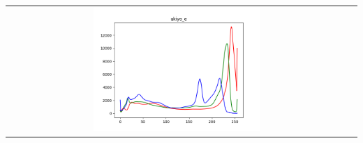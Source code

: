 \documentclass{article}
\begin{document}
\begin{center}
\begin{tabular}{cc}
				\includegraphics[width=0.5\textwidth]{plots/ukiyo_e.png}\par

			\end{tabular}
		\end{center}
		\newpage

		\begin{center}
			\begin{tabular}{cc}


\end{tabular}
\end{center}
\end{document}
